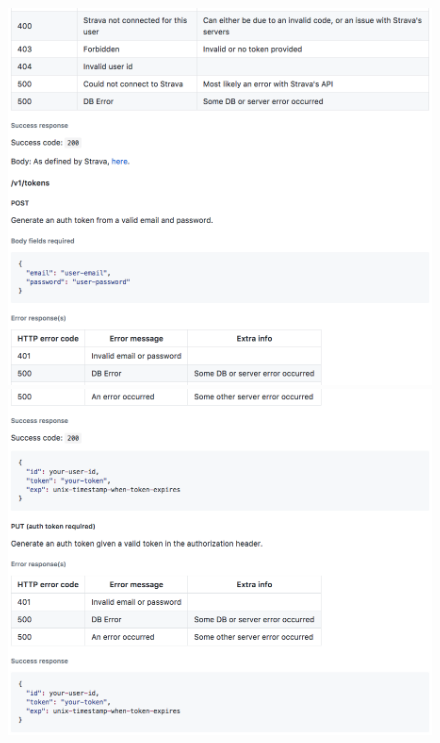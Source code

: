\documentclass[11pt,openright,a4paper]{report}
\begin{document}
\begin{appendices}
\begin{figure}[ht]
  \centering
  \includegraphics[width=.9\textwidth]{i/apidocs15.png}
  \includegraphics[width=.9\textwidth]{i/apidocs16.png}
\end{figure}

\clearpage

\end{appendices}
\end{document}
